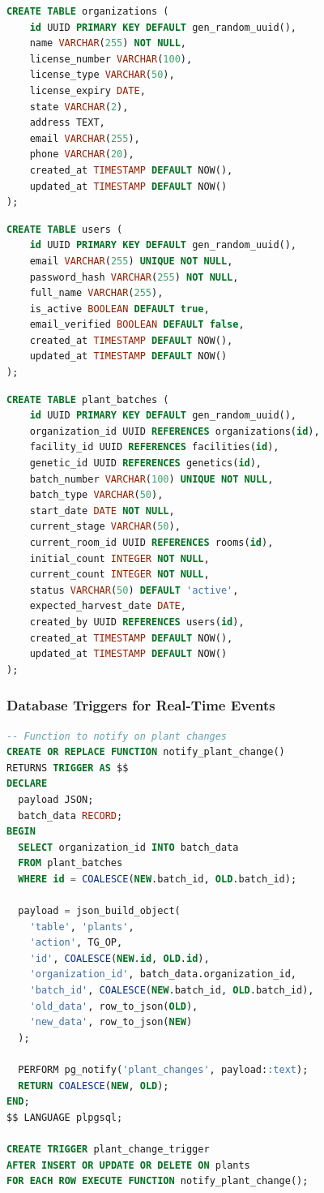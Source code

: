 \documentclass[11pt,a4paper]{article}
\begin{document}
\begin{lstlisting}[language=SQL, caption=Organizations Table]
CREATE TABLE organizations (
    id UUID PRIMARY KEY DEFAULT gen_random_uuid(),
    name VARCHAR(255) NOT NULL,
    license_number VARCHAR(100),
    license_type VARCHAR(50),
    license_expiry DATE,
    state VARCHAR(2),
    address TEXT,
    email VARCHAR(255),
    phone VARCHAR(20),
    created_at TIMESTAMP DEFAULT NOW(),
    updated_at TIMESTAMP DEFAULT NOW()
);
\end{lstlisting}

\begin{lstlisting}[language=SQL, caption=Users \& Authentication Table]
CREATE TABLE users (
    id UUID PRIMARY KEY DEFAULT gen_random_uuid(),
    email VARCHAR(255) UNIQUE NOT NULL,
    password_hash VARCHAR(255) NOT NULL,
    full_name VARCHAR(255),
    is_active BOOLEAN DEFAULT true,
    email_verified BOOLEAN DEFAULT false,
    created_at TIMESTAMP DEFAULT NOW(),
    updated_at TIMESTAMP DEFAULT NOW()
);
\end{lstlisting}

\begin{lstlisting}[language=SQL, caption=Plant Batches Table]
CREATE TABLE plant_batches (
    id UUID PRIMARY KEY DEFAULT gen_random_uuid(),
    organization_id UUID REFERENCES organizations(id),
    facility_id UUID REFERENCES facilities(id),
    genetic_id UUID REFERENCES genetics(id),
    batch_number VARCHAR(100) UNIQUE NOT NULL,
    batch_type VARCHAR(50),
    start_date DATE NOT NULL,
    current_stage VARCHAR(50),
    current_room_id UUID REFERENCES rooms(id),
    initial_count INTEGER NOT NULL,
    current_count INTEGER NOT NULL,
    status VARCHAR(50) DEFAULT 'active',
    expected_harvest_date DATE,
    created_by UUID REFERENCES users(id),
    created_at TIMESTAMP DEFAULT NOW(),
    updated_at TIMESTAMP DEFAULT NOW()
);
\end{lstlisting}

\subsubsection{Database Triggers for Real-Time Events}
\begin{lstlisting}[language=SQL, caption=PostgreSQL Trigger for Real-Time Updates]
-- Function to notify on plant changes
CREATE OR REPLACE FUNCTION notify_plant_change()
RETURNS TRIGGER AS $$
DECLARE
  payload JSON;
  batch_data RECORD;
BEGIN
  SELECT organization_id INTO batch_data
  FROM plant_batches
  WHERE id = COALESCE(NEW.batch_id, OLD.batch_id);
  
  payload = json_build_object(
    'table', 'plants',
    'action', TG_OP,
    'id', COALESCE(NEW.id, OLD.id),
    'organization_id', batch_data.organization_id,
    'batch_id', COALESCE(NEW.batch_id, OLD.batch_id),
    'old_data', row_to_json(OLD),
    'new_data', row_to_json(NEW)
  );
  
  PERFORM pg_notify('plant_changes', payload::text);
  RETURN COALESCE(NEW, OLD);
END;
$$ LANGUAGE plpgsql;

CREATE TRIGGER plant_change_trigger
AFTER INSERT OR UPDATE OR DELETE ON plants
FOR EACH ROW EXECUTE FUNCTION notify_plant_change();
\end{lstlisting}
\end{document}
